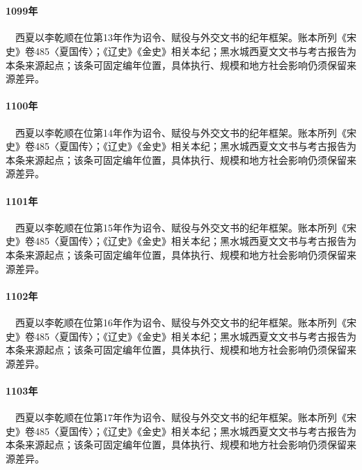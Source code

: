\section{}

\paragraph{1099年}　西夏以李乾顺在位第13年作为诏令、赋役与外交文书的纪年框架。账本所列《宋史》卷485〈夏国传〉；《辽史》《金史》相关本纪；黑水城西夏文文书与考古报告为本条来源起点；该条可固定编年位置，具体执行、规模和地方社会影响仍须保留来源差异。

\paragraph{1100年}　西夏以李乾顺在位第14年作为诏令、赋役与外交文书的纪年框架。账本所列《宋史》卷485〈夏国传〉；《辽史》《金史》相关本纪；黑水城西夏文文书与考古报告为本条来源起点；该条可固定编年位置，具体执行、规模和地方社会影响仍须保留来源差异。

\paragraph{1101年}　西夏以李乾顺在位第15年作为诏令、赋役与外交文书的纪年框架。账本所列《宋史》卷485〈夏国传〉；《辽史》《金史》相关本纪；黑水城西夏文文书与考古报告为本条来源起点；该条可固定编年位置，具体执行、规模和地方社会影响仍须保留来源差异。

\paragraph{1102年}　西夏以李乾顺在位第16年作为诏令、赋役与外交文书的纪年框架。账本所列《宋史》卷485〈夏国传〉；《辽史》《金史》相关本纪；黑水城西夏文文书与考古报告为本条来源起点；该条可固定编年位置，具体执行、规模和地方社会影响仍须保留来源差异。

\paragraph{1103年}　西夏以李乾顺在位第17年作为诏令、赋役与外交文书的纪年框架。账本所列《宋史》卷485〈夏国传〉；《辽史》《金史》相关本纪；黑水城西夏文文书与考古报告为本条来源起点；该条可固定编年位置，具体执行、规模和地方社会影响仍须保留来源差异。

